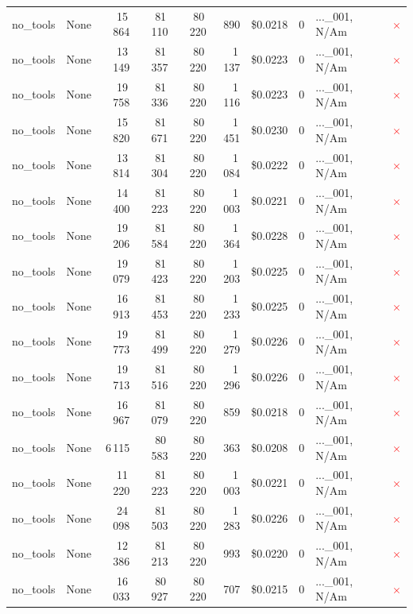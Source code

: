 \documentclass[a4paper,11pt]{article}
\begin{document}
\begin{table}[H]
{\begin{tabular}{l r r r r r r r l c}
no\_tools & None & 15\,864 & 81\,110 & 80\,220 & 890 & \$0.0218 & 0 & ...\_001, N/Am & \textcolor{red}{\(\times\)} \\
no\_tools & None & 13\,149 & 81\,357 & 80\,220 & 1\,137 & \$0.0223 & 0 & ...\_001, N/Am & \textcolor{red}{\(\times\)} \\
no\_tools & None & 19\,758 & 81\,336 & 80\,220 & 1\,116 & \$0.0223 & 0 & ...\_001, N/Am & \textcolor{red}{\(\times\)} \\
no\_tools & None & 15\,820 & 81\,671 & 80\,220 & 1\,451 & \$0.0230 & 0 & ...\_001, N/Am & \textcolor{red}{\(\times\)} \\
no\_tools & None & 13\,814 & 81\,304 & 80\,220 & 1\,084 & \$0.0222 & 0 & ...\_001, N/Am & \textcolor{red}{\(\times\)} \\
no\_tools & None & 14\,400 & 81\,223 & 80\,220 & 1\,003 & \$0.0221 & 0 & ...\_001, N/Am & \textcolor{red}{\(\times\)} \\
no\_tools & None & 19\,206 & 81\,584 & 80\,220 & 1\,364 & \$0.0228 & 0 & ...\_001, N/Am & \textcolor{red}{\(\times\)} \\
no\_tools & None & 19\,079 & 81\,423 & 80\,220 & 1\,203 & \$0.0225 & 0 & ...\_001, N/Am & \textcolor{red}{\(\times\)} \\
no\_tools & None & 16\,913 & 81\,453 & 80\,220 & 1\,233 & \$0.0225 & 0 & ...\_001, N/Am & \textcolor{red}{\(\times\)} \\
no\_tools & None & 19\,773 & 81\,499 & 80\,220 & 1\,279 & \$0.0226 & 0 & ...\_001, N/Am & \textcolor{red}{\(\times\)} \\
no\_tools & None & 19\,713 & 81\,516 & 80\,220 & 1\,296 & \$0.0226 & 0 & ...\_001, N/Am & \textcolor{red}{\(\times\)} \\
no\_tools & None & 16\,967 & 81\,079 & 80\,220 & 859 & \$0.0218 & 0 & ...\_001, N/Am & \textcolor{red}{\(\times\)} \\
no\_tools & None & 6\,115 & 80\,583 & 80\,220 & 363 & \$0.0208 & 0 & ...\_001, N/Am & \textcolor{red}{\(\times\)} \\
no\_tools & None & 11\,220 & 81\,223 & 80\,220 & 1\,003 & \$0.0221 & 0 & ...\_001, N/Am & \textcolor{red}{\(\times\)} \\
no\_tools & None & 24\,098 & 81\,503 & 80\,220 & 1\,283 & \$0.0226 & 0 & ...\_001, N/Am & \textcolor{red}{\(\times\)} \\
no\_tools & None & 12\,386 & 81\,213 & 80\,220 & 993 & \$0.0220 & 0 & ...\_001, N/Am & \textcolor{red}{\(\times\)} \\
no\_tools & None & 16\,033 & 80\,927 & 80\,220 & 707 & \$0.0215 & 0 & ...\_001, N/Am & \textcolor{red}{\(\times\)} \\

\end{tabular}}
\end{table}
\end{document}
